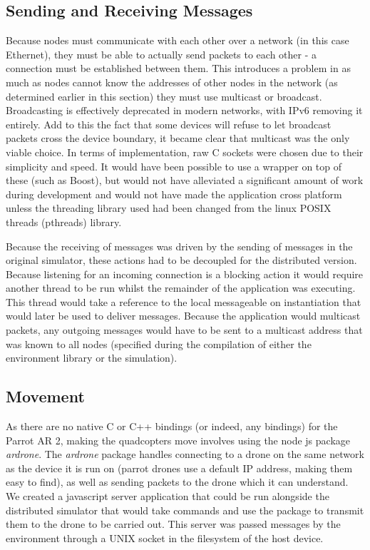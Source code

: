 \subsection{Sending and Receiving Messages}
Because nodes must communicate with each other over a network (in this case Ethernet), they must be able to actually send packets to each other - a connection must be established between them. This introduces a problem in as much as nodes cannot know the addresses of other nodes in the network (as determined earlier in this section) they must use multicast or broadcast. Broadcasting is effectively deprecated in modern networks, with IPv6 removing it entirely. Add to this the fact that some devices will refuse to let broadcast packets cross the device boundary, it became clear that multicast was the only viable choice. In terms of implementation, raw C sockets were chosen due to their simplicity and speed. It would have been possible to use a wrapper on top of these (such as Boost), but would not have alleviated a significant amount of work during development and would not have made the application cross platform unless the threading library used had been changed from the linux POSIX threads (pthreads) library.

Because the receiving of messages was driven by the sending of messages in the original simulator, these actions had to be decoupled for the distributed version. Because listening for an incoming connection is a blocking action it would require another thread to be run whilst the remainder of the application was executing. This thread would take a reference to the local messageable on instantiation that would later be used to deliver messages. Because the application would multicast packets, any outgoing messages would have to be sent to a multicast address that was known to all nodes (specified during the compilation of either the environment library or the simulation).

\subsection{Movement}
As there are no native C or C++ bindings (or indeed, any bindings) for the Parrot AR 2, making the quadcopters move involves using the node js package \textit{ardrone}. The \textit{ardrone} package handles connecting to a drone on the same network as the device it is run on (parrot drones use a default IP address, making them easy to find), as well as sending packets to the drone which it can understand. We created a javascript server application that could be run alongside the distributed simulator that would take commands and use the package to transmit them to the drone to be carried out. This server was passed messages by the environment through a UNIX socket in the filesystem of the host device.

